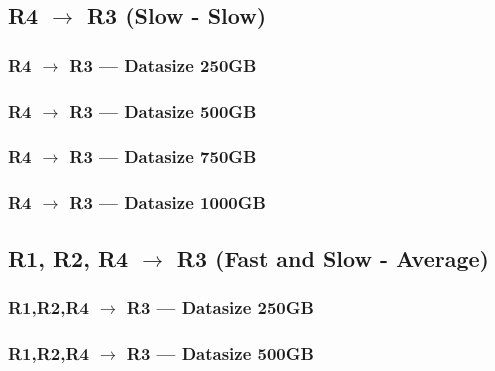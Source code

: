 \documentclass[a4paper,11pt]{article}
\begin{document}
\newpage

\subsection{R4 $\rightarrow$ R3 (Slow - Slow)}
\subsubsection{R4 $\rightarrow$ R3 --- Datasize 250GB}



\newpage
\subsubsection{R4 $\rightarrow$ R3 --- Datasize 500GB}



\newpage
\subsubsection{R4 $\rightarrow$ R3 --- Datasize 750GB}



\newpage
\subsubsection{R4 $\rightarrow$ R3 --- Datasize 1000GB}




\subsection{R1, R2, R4 $\rightarrow$ R3 (Fast and Slow - Average)}
\subsubsection{R1,R2,R4 $\rightarrow$ R3 --- Datasize 250GB}



\newpage
\subsubsection{R1,R2,R4 $\rightarrow$ R3 --- Datasize 500GB}


\end{document}
